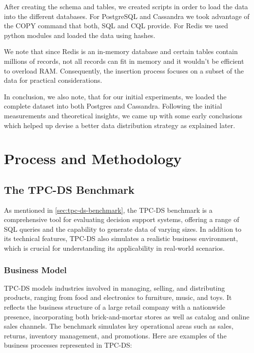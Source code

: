 \documentclass[conference]{IEEEtran}
\begin{document}
After creating the schema and tables, we created scripts in order to load the data into the different databases. For PostgreSQL and Cassandra we took advantage of the COPY command that both, SQL and CQL provide.
For Redis we used python modules and loaded the data using hashes.

We note that since Redis is an in-memory database and certain tables contain millions of records, not all records can fit in memory and it wouldn't be efficient to overload RAM. Consequently, the insertion process
focuses on a subset of the data for practical considerations.

In conclusion, we also note, that for our initial experiments, we loaded the complete dataset into both Postgres and Cassandra. Following the initial measurements and theoretical insights, we came up with some early conclusions
which helped up devise a better data distribution strategy as explained later.

\section{Process and Methodology}

\subsection{The TPC-DS Benchmark}

As mentioned in \ref{sec:tpc-ds-benchmark}, the TPC-DS benchmark is a comprehensive tool for evaluating decision support systems,
offering a range of SQL queries and the capability to generate data of varying sizes. In addition to its
technical features, TPC-DS also simulates a realistic business environment, which is crucial for understanding
its applicability in real-world scenarios.

\subsubsection{Business Model}

TPC-DS models industries involved in managing, selling, and distributing products,
ranging from food and electronics to furniture, music, and toys. It reflects the
business structure of a large retail company with a nationwide presence, incorporating
both brick-and-mortar stores as well as catalog and online sales channels. The benchmark
simulates key operational areas such as sales, returns, inventory management, and
promotions. Here are examples of the business processes represented in TPC-DS:
\end{document}
